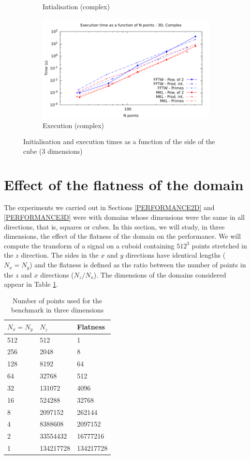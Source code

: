 \documentclass[12pt, a4paper]{article}
\begin{document}
\begin{figure}[H]
\begin{subfigure}{.5\textwidth}
\caption{Intialisation (complex)}
\label{3DCI}
\end{subfigure}%
\begin{subfigure}{.5\textwidth}
\centering
\includegraphics[width=.9\linewidth]{graphs/3d-exec-c.pdf}
\caption{Execution (complex)}
\label{3DC}
\end{subfigure}
\caption{Initialisation and execution times as a function of the side of the cube (3 dimensions)}
\label{3D}
\end{figure}
\section{Effect of the flatness of the domain}\label{Sec:FLATNESS}

The experiments we carried out in Sections \ref{PERFORMANCE2D} and \ref{PERFORMANCE3D} were with domains whose dimensions were the same in all directions, that is, squares or cubes. In this section, we will study, in three dimensions, the effect of the flatness of the domain on the performance. We will compute the transform of a signal on a cuboid containing $512^3$ points stretched in the $z$ direction. The sides in the $x$ and $y$ directions have identical lengths ($N_x=N_y$) and the flatness is defined as the ratio between the number of points in the $z$ and $x$ directions ($N_z/N_x$). The dimensions of the domains considered appear in Table \ref{FLATNESSDIM}.
\begin{table}[H]
\centering
\begin{tabular}{|l|l|l|}
  \hline
  $N_x=N_y$ & $N_z $ & Flatness\\ 
  \hline
  \hline
512 & 512       & 1\\ \hline
256 & 2048      & 8\\ \hline
128 & 8192      & 64\\ \hline
64  & 32768     & 512\\ \hline
32  & 131072    & 4096\\ \hline
16  & 524288    & 32768\\ \hline
8   & 2097152   & 262144\\ \hline
4   & 8388608   & 2097152\\ \hline
2   & 33554432  & 16777216\\ \hline
1   & 134217728 & 134217728\\ \hline
\end{tabular}
\caption{Number of points used for the benchmark in three dimensions}\label{FLATNESSDIM}
\end{table}
\end{document}
